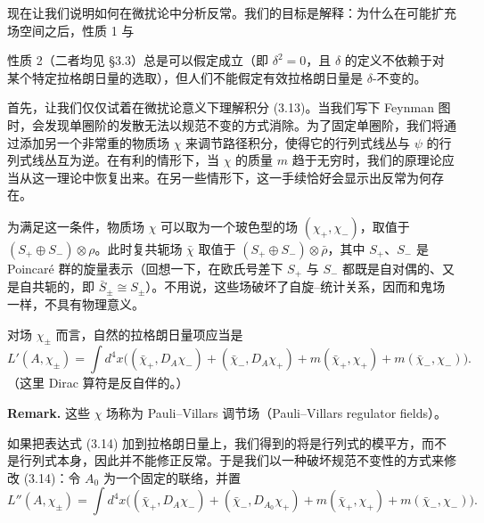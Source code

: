 
现在让我们说明如何在微扰论中分析反常。我们的目标是解释：为什么在可能扩充场空间之后，性质 1 与

性质 2（二者均见 §3.3）总是可以假定成立（即 $\delta^2=0$，且 $\delta$ 的定义不依赖于对某个特定拉格朗日量的选取），但人们不能假定有效拉格朗日量是 $\delta$-不变的。

首先，让我们仅仅试着在微扰论意义下理解积分 (3.13)。当我们写下 Feynman 图时，会发现单圈阶的发散无法以规范不变的方式消除。为了固定单圈阶，我们将通过添加另一个非常重的物质场 $\chi$ 来调节路径积分，使得它的行列式线丛与 $\psi$ 的行列式线丛互为逆。在有利的情形下，当 $\chi$ 的质量 $m$ 趋于无穷时，我们的原理论应当从这一理论中恢复出来。在另一些情形下，这一手续恰好会显示出反常为何存在。

为满足这一条件，物质场 $\chi$ 可以取为一个玻色型的场 $(\chi_+,\chi_-)$，取值于 $(S_+\oplus S_-)\otimes\rho$。此时复共轭场 $\bar\chi$ 取值于 $(S_+\oplus S_-)\otimes\bar\rho$，其中 $S_+$、$S_-$ 是 Poincaré 群的旋量表示（回想一下，在欧氏号差下 $S_+$ 与 $S_-$ 都既是自对偶的、又是自共轭的，即 $\bar S_{\pm}\cong S_{\pm}$）。不用说，这些场破坏了自旋–统计关系，因而和鬼场一样，不具有物理意义。

对场 $\chi_{\pm}$ 而言，自然的拉格朗日量项应当是
\begin{equation}
  \tag{3.14}
  \label{eq:3-14}
  L'(A,\chi_{\pm})=\int d^4x\Big((\bar\chi_+,D_A\chi_-)+(\bar\chi_-,D_A\chi_+)+m(\bar\chi_+,\chi_+)+m(\bar\chi_-,\chi_-)\Big).
\end{equation}
（这里 Dirac 算符是反自伴的。）

\textbf{Remark.} 这些 $\chi$ 场称为 Pauli–Villars 调节场（Pauli–Villars regulator fields）。

如果把表达式 (3.14) 加到拉格朗日量上，我们得到的将是行列式的模平方，而不是行列式本身，因此并不能修正反常。于是我们以一种破坏规范不变性的方式来修改 (3.14)：令 $A_0$ 为一个固定的联络，并置
\begin{equation}
  \tag{3.15}
  \label{eq:3-15}
  L''(A,\chi_{\pm})=\int d^4x\Big((\bar\chi_+,D_A\chi_-)+(\bar\chi_-,D_{A_0}\chi_+)+m(\bar\chi_+,\chi_+)+m(\bar\chi_-,\chi_-)\Big).
\end{equation}

